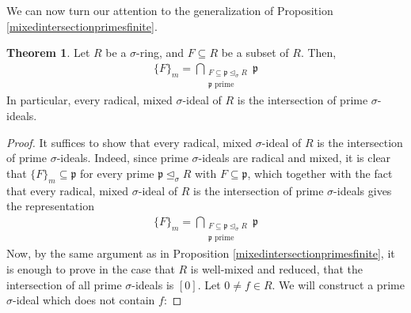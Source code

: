 \documentclass{article}
\def\p{\mathfrak{p}}
\def\s{\sigma}
\def\si{\unlhd_{\sigma}}
\newenvironment{bew}{\begin{proof}[Proof]}{\end{proof}}
\theoremstyle{definition}
\newtheorem{theorem}[Satz]{Theorem}
\begin{document}
We can now turn our attention to the generalization of Proposition \ref{mixedintersectionprimesfinite}. 


\begin{theorem}\label{intersectionprimes}
Let $R$ be a $\s$-ring, and $F \subseteq R$ be a subset of $R$. Then, 
\begin{align*} \{F\}_m = \bigcap_{\substack{F \subseteq \p \si R \\ \p \text{ prime}}} \p \end{align*}
In particular, every radical, mixed $\s$-ideal of $R$ is the intersection of prime $\s$-ideals.
\begin{bew}
It suffices to show that every radical, mixed $\s$-ideal of $R$ is the intersection of prime $\s$-ideals.
Indeed, since prime $\s$-ideals are radical and mixed, it is clear that $\{F\}_m \subseteq \p$ for every prime $\p \si R$ with $F \subseteq \p$, which together with the fact that every radical, mixed $\s$-ideal of $R$ is the intersection of prime $\s$-ideals gives the representation 
\begin{align*} \{F\}_m = \bigcap_{\substack{F \subseteq \p \si R \\ \p \text{ prime}}} \p \end{align*}
Now, by the same argument as in Proposition \ref{mixedintersectionprimesfinite}, it is enough to prove in the case that $R$ is well-mixed and reduced, that the intersection of all prime $\s$-ideals is $[0]$.
Let $0 \neq f \in R$. We will construct a prime $\s$-ideal which does not contain $f$: 


\end{bew}
\end{theorem}
\end{document}
